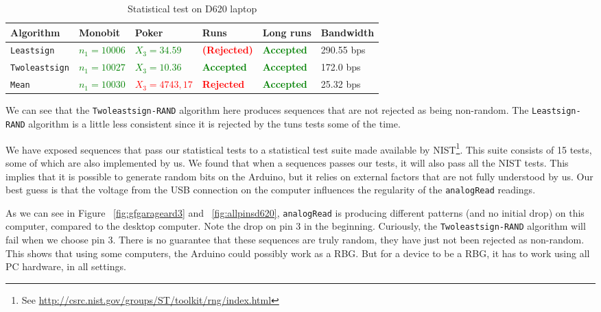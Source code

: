 \documentclass[a4paper]{article}           %
\begin{document}
  \begin{table}[H]
    \begin{center}
      \begin{tabular}{| l | p{1.8cm} | p{2.2cm} | l | l | l |}
        \hline
        Algorithm & Monobit & Poker & Runs & Long runs & Bandwidth\\
        \hline
        \hline
        \texttt{Leastsign} & \textcolor{green}{$n_1 = 10 006$}
        & \textcolor{green}{$X_3 = 34.59$}
        & \textcolor{red}{\textbf{(Rejected)}}
        & \textcolor{green}{\textbf{Accepted}}
        & 290.55 bps \\

        \texttt{Twoleastsign} & \textcolor{green}{$n_1 = 10 027$}
        & \textcolor{green}{$X_3 = 10.36$}
        & \textcolor{green}{\textbf{Accepted}}
        & \textcolor{green}{\textbf{Accepted}}
        & 172.0 bps \\

        \texttt{Mean} & \textcolor{green}{$n_1 = 10030$}
        & \textcolor{red}{$X_3 = 4743,17$}
        & \textcolor{red}{\textbf{Rejected}}
        & \textcolor{green}{\textbf{Accepted}}
        & 25.32 bps \\

        \hline
      \end{tabular}
    \end{center}
    \label{tab:res1}
    \caption{Statistical test on D620 laptop}
  \end{table}

We can see that the \texttt{Twoleastsign-RAND} algorithm here produces sequences that are not rejected as being non-random. The \texttt{Leastsign-RAND} algorithm is a little less consistent since it is rejected by the tuns tests some of the time.

We have exposed sequences that pass our statistical tests to a statistical test suite made available by NIST\footnote{See \url{http://csrc.nist.gov/groups/ST/toolkit/rng/index.html}}. This suite consists of 15 tests, some of which are also implemented by us. We found that when a sequences passes our tests, it will also pass all the NIST tests. This implies that it is possible to generate random bits on the Arduino, but it relies on external factors that are not fully understood by us. Our best guess is that the voltage from the USB connection on the computer influences the regularity of the \texttt{analogRead} readings. 

 As we can see in Figure ~\ref{fig:gfgarageard3} and ~\ref{fig:allpinsd620}, \texttt{analogRead} is producing different patterns (and no initial drop) on this computer, compared to the desktop computer. Note the drop on pin 3 in the beginning. Curiously, the \texttt{Twoleastsign-RAND} algorithm will fail when we choose pin 3. There is no guarantee that these sequences are truly random, they have just not been rejected as non-random. This shows that using some computers, the Arduino could possibly work as a RBG. But for a device to be a RBG, it has to work using all PC hardware, in all settings. 
\end{document}
